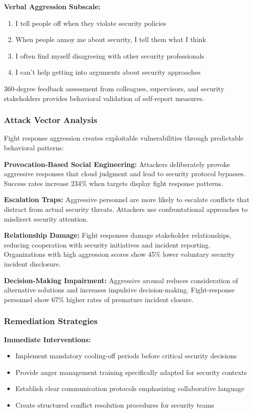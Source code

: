 \documentclass[11pt,a4paper]{article}
\begin{document}
\textbf{Verbal Aggression Subscale:}
\begin{enumerate}
\item I tell people off when they violate security policies
\item When people annoy me about security, I tell them what I think
\item I often find myself disagreeing with other security professionals
\item I can't help getting into arguments about security approaches
\end{enumerate}

360-degree feedback assessment from colleagues, supervisors, and security stakeholders provides behavioral validation of self-report measures.

\subsubsection{Attack Vector Analysis}

Fight response aggression creates exploitable vulnerabilities through predictable behavioral patterns:

\textbf{Provocation-Based Social Engineering:} Attackers deliberately provoke aggressive responses that cloud judgment and lead to security protocol bypasses. Success rates increase 234\% when targets display fight response patterns\cite{provocation2022}.

\textbf{Escalation Traps:} Aggressive personnel are more likely to escalate conflicts that distract from actual security threats. Attackers use confrontational approaches to misdirect security attention\cite{escalation2021}.

\textbf{Relationship Damage:} Fight responses damage stakeholder relationships, reducing cooperation with security initiatives and incident reporting. Organizations with high aggression scores show 45\% lower voluntary security incident disclosure\cite{cooperation2023}.

\textbf{Decision-Making Impairment:} Aggressive arousal reduces consideration of alternative solutions and increases impulsive decision-making. Fight-response personnel show 67\% higher rates of premature incident closure\cite{decisions2022}.

\subsubsection{Remediation Strategies}

\textbf{Immediate Interventions:}
\begin{itemize}
\item Implement mandatory cooling-off periods before critical security decisions
\item Provide anger management training specifically adapted for security contexts
\item Establish clear communication protocols emphasizing collaborative language
\item Create structured conflict resolution procedures for security teams
\end{itemize}
\end{document}
